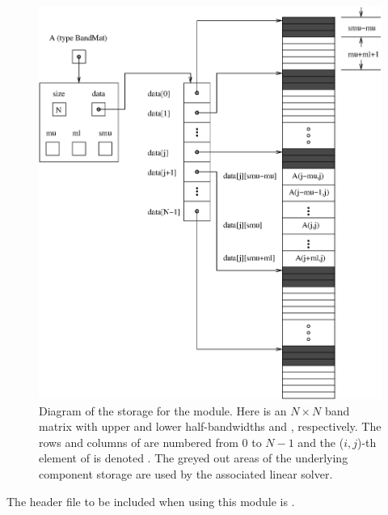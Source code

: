 \begin{figure}
\centerline{\includegraphics[width=4.5 in]{bandmat}}
\caption[Diagram of the storage for a banded matrix of type ]
  {Diagram of the storage for the {\sunmatband} module. Here  is an
  $N \times N$ band matrix with upper and lower half-bandwidths 
  and , respectively. The rows and columns of  are
  numbered from $0$ to $N-1$ and the ($i,j$)-th element of  is
  denoted . The greyed out areas of the underlying
  component storage are used by the associated {\sunlinsolband}
  linear solver.}\label{f:sunbandmat}
\end{figure}

\noindent The header file to be included when using this module 
is . \\

